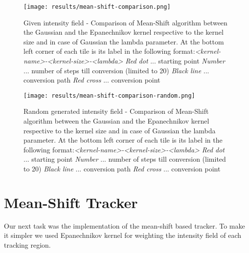 \documentclass[runningheads]{llncs}
\begin{document}
\begin{figure}
    \centering
    \texttt{[image: results/mean-shift-comparison.png]}
    \caption{Given intensity field - Comparison of Mean-Shift algorithm between the Gaussian and the Epanechnikov kernel respective to the kernel size and in case of Gaussian the lambda parameter. At the bottom left corner of each tile is its label in the following format:\newline \textit{\textless kernel-name\textgreater-\textless kernel-size\textgreater-\textless lambda\textgreater}
    \newline \textit{Red dot} ... starting point
    \newline \textit{Number} ... number of steps till conversion (limited to 20)
    \newline \textit{Black line} ... conversion path
    \newline \textit{Red cross} ... conversion point}
    \label{img_meanshift}
\end{figure}

\begin{figure}
    \centering
    \texttt{[image: results/mean-shift-comparison-random.png]}
    \caption{Random generated intensity field - Comparison of Mean-Shift algorithm between the Gaussian and the Epanechnikov kernel respective to the kernel size and in case of Gaussian the lambda parameter. At the bottom left corner of each tile is its label in the following format:\newline \textit{\textless kernel-name\textgreater-\textless kernel-size\textgreater-\textless lambda\textgreater}
    \newline \textit{Red dot} ... starting point
    \newline \textit{Number} ... number of steps till conversion (limited to 20)
    \newline \textit{Black line} ... conversion path
    \newline \textit{Red cross} ... conversion point}
    \label{img_meanshift_random}
\end{figure}

\newpage
\section{Mean-Shift Tracker}

Our next task was the implementation of the mean-shift based tracker. To make it simpler we used Epanechnikov kernel for weighting the intensity field of each tracking region.
\end{document}
